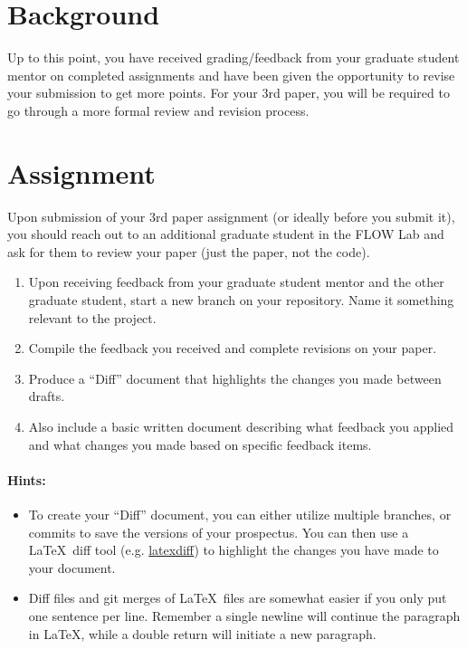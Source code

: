 \documentclass[12pt]{article}
\begin{document}

\section{Background}

Up to this point, you have received grading/feedback from your graduate student mentor on completed assignments and have been given the opportunity to revise your submission to get more points. For your 3rd paper, you will be required to go through a more formal review and revision process.  



\section{Assignment}



Upon submission of your 3rd paper assignment (or ideally before you submit it), you should reach out to an additional graduate student in the FLOW Lab and ask for them to review your paper (just the paper, not the code).

\begin{enumerate}
	\item Upon receiving feedback from your graduate student mentor and the other graduate student, start a new branch on your repository. Name it something relevant to the project. 
	\item Compile the feedback you received and complete revisions on your paper.
	\item Produce a ``Diff'' document that highlights the changes you made between drafts.
	\item Also include a basic written document describing what feedback you applied and what changes you made based on specific feedback items.
\end{enumerate}
	

\bigskip

\paragraph{Hints:}

\begin{itemize}
	\item To create your ``Diff'' document, you can either utilize multiple branches, or commits to save the versions of your prospectus.
	You can then use a \LaTeX~diff tool (e.g. \href{https://texblog.org/2018/08/14/track-changes-with-latexdiff/}{latexdiff}) to highlight the changes you have made to your document.
	\item Diff files and git merges of \LaTeX~files are somewhat easier if you only put one sentence per line.
	Remember a single newline will continue the paragraph in \LaTeX, while a double return will initiate a new paragraph.
\end{itemize}




	
	
\end{document}
